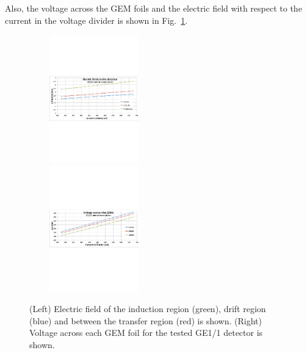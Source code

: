 Also, the voltage across the GEM foils and  the electric field  with respect to the current in the voltage divider is shown in Fig.~\ref{fig:GEM_voltage_electricfield}. 
\begin{figure}[!htbp]
    \centering
    \includegraphics[width=0.5\textwidth,height=5.5cm]{figures/GEM/E_fields_new.pdf}%
    \includegraphics[width=0.5\textwidth,height=5.5cm]{figures/GEM/dV_GEM_new.pdf}
    \caption{(Left) Electric field of the induction region (green), drift region (blue) and between the transfer region (red) is shown. (Right) Voltage across each GEM foil for the tested GE1/1 detector is shown.}
    \label{fig:GEM_voltage_electricfield}
\end{figure}

